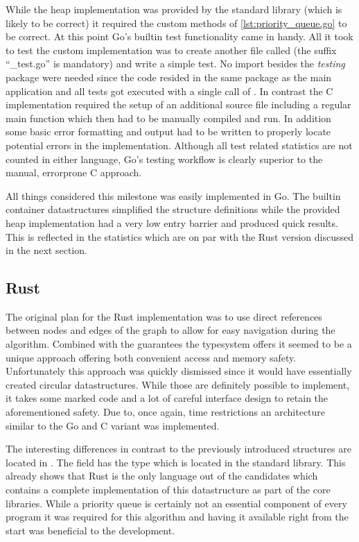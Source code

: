 While the heap implementation was provided by the standard library (which is likely to be correct) it required the custom methods of \autoref{lst:priority_queue.go} to be correct. At this point Go's builtin test functionality came in handy. All it took to test the custom implementation was to create another file called  (the suffix ``\_test.go'' is mandatory) and write a simple test. No import besides the \textit{testing} package were needed since the code resided in the same package as the main application and all tests got executed with a single call of . In contrast the C implementation required the setup of an additional source file including a regular main function which then had to be manually compiled and run. In addition some basic error formatting and output had to be written to properly locate potential errors in the implementation. Although all test related statistics are not counted in either language, Go's testing workflow is clearly superior to the manual, errorprone C approach.

All things considered this milestone was easily implemented in Go. The builtin container datastructures simplified the structure definitions while the provided heap implementation had a very low entry barrier and produced quick results. This is reflected in the statistics which are on par with the Rust version discussed in the next section.

\subsection{Rust}
\label{subsec:Implementation::Graph_Representation::Rust}

The original plan for the Rust implementation was to use direct references between nodes and edges of the graph to allow for easy navigation during the algorithm. Combined with the guarantees the typesystem offers it seemed to be a unique approach offering both convenient access and memory safety. Unfortunately this approach was quickly dismissed since it would have essentially created circular datastructures. While those are definitely possible to implement, it takes some  marked code and a lot of careful interface design to retain the aforementioned safety. Due to, once again, time restrictions an architecture similar to the Go and C variant was implemented.

The interesting differences in contrast to the previously introduced structures are located in . The  field has the type  which is located in the standard library. This already shows that Rust is the only language out of the candidates which contains a complete implementation of this datastructure as part of the core libraries. While a priority queue is certainly not an essential component of every program it was required for this algorithm and having it available right from the start was beneficial to the development.
\\



